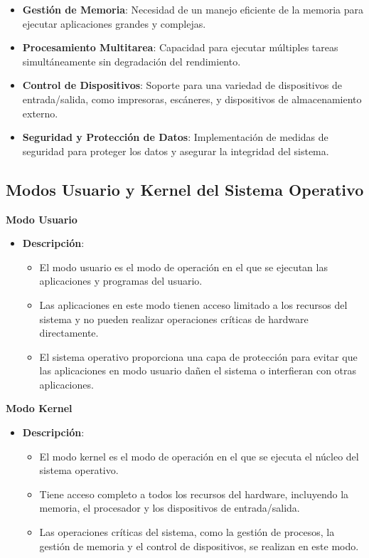 \begin{itemize}
	\item \textbf{Gestión de Memoria}: Necesidad de un manejo eficiente de la memoria para ejecutar aplicaciones grandes y complejas.
	\item \textbf{Procesamiento Multitarea}: Capacidad para ejecutar múltiples tareas simultáneamente sin degradación del rendimiento.
	\item \textbf{Control de Dispositivos}: Soporte para una variedad de dispositivos de entrada/salida, como impresoras, escáneres, y dispositivos de almacenamiento externo.
	\item \textbf{Seguridad y Protección de Datos}: Implementación de medidas de seguridad para proteger los datos y asegurar la integridad del sistema.
\end{itemize}



\subsection*{Modos Usuario y Kernel del Sistema Operativo}

\textbf{Modo Usuario}

\begin{itemize}
	\item \textbf{Descripción}: 
	\begin{itemize}
		\item El modo usuario es el modo de operación en el que se ejecutan las aplicaciones y programas del usuario.
		\item Las aplicaciones en este modo tienen acceso limitado a los recursos del sistema y no pueden realizar operaciones críticas de hardware directamente.
		\item El sistema operativo proporciona una capa de protección para evitar que las aplicaciones en modo usuario dañen el sistema o interfieran con otras aplicaciones.
	\end{itemize}

\end{itemize}

\textbf{Modo Kernel}

\begin{itemize}
	\item \textbf{Descripción}:
	\begin{itemize}
		\item El modo kernel es el modo de operación en el que se ejecuta el núcleo del sistema operativo.
		\item Tiene acceso completo a todos los recursos del hardware, incluyendo la memoria, el procesador y los dispositivos de entrada/salida.
		\item Las operaciones críticas del sistema, como la gestión de procesos, la gestión de memoria y el control de dispositivos, se realizan en este modo.
	\end{itemize}

\end{itemize}

